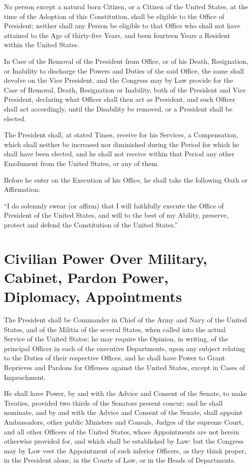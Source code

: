 \documentclass{constitution}
\begin{document}
No person except a natural born Citizen,
or a Citizen of the United States, at the time of the Adoption of this Constitution,
shall be eligible to the Office of President;
neither shall any Person be eligible to that Office who shall not
have attained to the Age of thirty-five Years,
and been fourteen Years a Resident within the United States.

In Case of the Removal of the President from Office,
or of his Death, Resignation, or Inability to discharge the Powers and Duties of the said Office,
the same shall devolve on the Vice President,
and the Congress may by Law provide for the Case
of Removal, Death, Resignation or Inability,
both of the President and Vice President,
declaring what Officer shall then act as President,
and such Officer shall act accordingly,
until the Disability be removed, or a President shall be elected.

The President shall, at stated Times,
receive for his Services, a Compensation,
which shall neither be increased nor diminished
during the Period for which he shall have been elected,
and he shall not receive within that Period any other Emolument from the United States,
or any of them.

Before he enter on the Execution of his Office, he shall take the following Oath or Affirmation:

“I do solemnly swear (or affirm)
that I will faithfully execute the Office of President of the United States,
and will to the best of my Ability,
preserve, protect and defend the Constitution of the United States.”

\section{Civilian Power Over Military, Cabinet, Pardon Power, Diplomacy, Appointments}
The President shall be Commander in Chief of the Army and Navy of the United States,
and of the Militia of the several States,
when called into the actual Service of the United States;
he may require the Opinion, in writing,
of the principal Officer in each of the executive Departments,
upon any subject relating to the Duties of their respective Offices,
and he shall have Power to Grant Reprieves and Pardons for Offenses against the United States,
except in Cases of Impeachment.

He shall have Power, by and with the Advice and Consent of the Senate, to make Treaties,
provided two thirds of the Senators present concur;
and he shall nominate,
and by and with the Advice and Consent of the Senate,
shall appoint Ambassadors,
	other public Ministers and Consuls,
	Judges of the supreme Court,
and	all other Officers of the United States,
whose Appointments are not herein otherwise provided for,
and which shall be established by Law:
but the Congress may by Law vest the Appointment of such inferior Officers,
as they think proper,
in the President alone,
	in the Courts of Law,
or	in the Heads of Departments.
\end{document}

